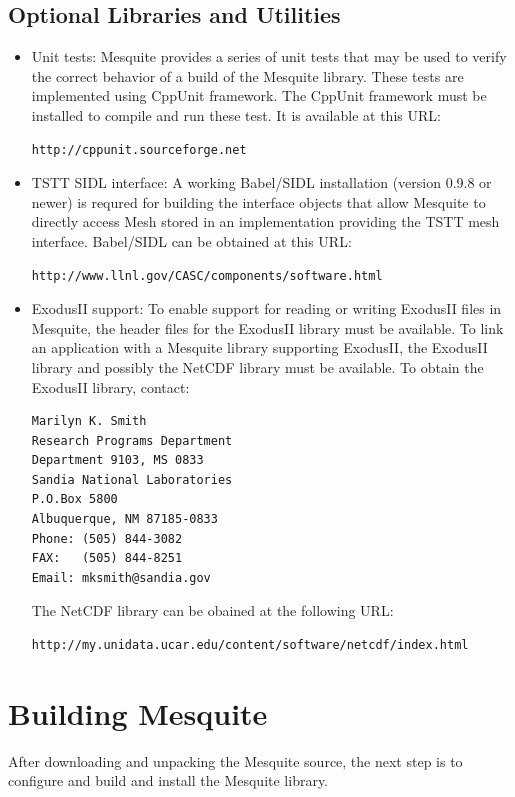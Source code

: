\subsection{Optional Libraries and Utilities}
\label{sec:depends}
\begin{itemize}
\item Unit tests:  Mesquite provides a series of unit tests that may be used
to verify the correct behavior of a build of the Mesquite library.  These tests
are implemented using CppUnit framework.  The CppUnit framework must be installed
to compile and run these test.  It is available at this URL:
\begin{verbatim}
http://cppunit.sourceforge.net
\end{verbatim}
\item TSTT SIDL interface:  A working Babel/SIDL installation (version 0.9.8 or 
newer) is requred for building the interface objects that allow Mesquite to
directly access Mesh stored in an implementation providing the TSTT mesh interface.  Babel/SIDL can be obtained at this URL:
\begin{verbatim}
http://www.llnl.gov/CASC/components/software.html
\end{verbatim}
\item ExodusII support:  To enable support for reading or writing ExodusII files in Mesquite, the header files for the ExodusII library must be available.  To link an application with a Mesquite library supporting ExodusII, the ExodusII library and possibly the NetCDF library must be available.  To obtain the ExodusII library, contact:
\begin{verbatim}
Marilyn K. Smith
Research Programs Department
Department 9103, MS 0833
Sandia National Laboratories
P.O.Box 5800
Albuquerque, NM 87185-0833
Phone: (505) 844-3082
FAX:   (505) 844-8251
Email: mksmith@sandia.gov
\end{verbatim}
The NetCDF library can be obained at the following URL:
\begin{verbatim}
http://my.unidata.ucar.edu/content/software/netcdf/index.html
\end{verbatim}
\end{itemize}


\section{Building Mesquite}
\label{sec:compiling}
After downloading and unpacking the Mesquite source, the next step is to 
configure and build and install the Mesquite library.  
